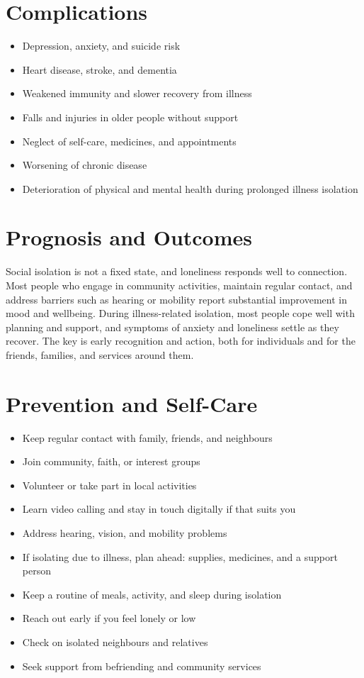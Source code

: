 \section*{Complications}
\begin{itemize}
    \item Depression, anxiety, and suicide risk
    \item Heart disease, stroke, and dementia
    \item Weakened immunity and slower recovery from illness
    \item Falls and injuries in older people without support
    \item Neglect of self-care, medicines, and appointments
    \item Worsening of chronic disease
    \item Deterioration of physical and mental health during prolonged illness isolation
\end{itemize}

\section*{Prognosis and Outcomes}
Social isolation is not a fixed state, and loneliness responds well to connection. Most people who engage in community activities, maintain regular contact, and address barriers such as hearing or mobility report substantial improvement in mood and wellbeing. During illness-related isolation, most people cope well with planning and support, and symptoms of anxiety and loneliness settle as they recover. The key is early recognition and action, both for individuals and for the friends, families, and services around them.

\section*{Prevention and Self-Care}
\begin{itemize}
    \item Keep regular contact with family, friends, and neighbours
    \item Join community, faith, or interest groups
    \item Volunteer or take part in local activities
    \item Learn video calling and stay in touch digitally if that suits you
    \item Address hearing, vision, and mobility problems
    \item If isolating due to illness, plan ahead: supplies, medicines, and a support person
    \item Keep a routine of meals, activity, and sleep during isolation
    \item Reach out early if you feel lonely or low
    \item Check on isolated neighbours and relatives
    \item Seek support from befriending and community services
\end{itemize}

